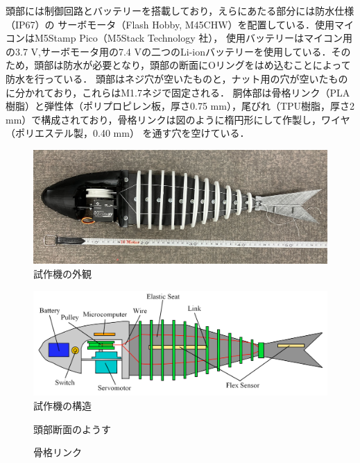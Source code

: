 頭部には制御回路とバッテリーを搭載しており，えらにあたる部分には防水仕様（IP67）の サーボモータ（Flash Hobby, M45CHW）を配置している．使用マイコンはM5Stamp Pico（M5Stack Technology 社），
使用バッテリーはマイコン用の3.7 V,サーボモータ用の7.4 Vの二つのLi-ionバッテリーを使用している．そのため，頭部は防水が必要となり，頭部の断面にOリングをはめ込むことによって防水を行っている．
頭部はネジ穴が空いたものと，ナット用の穴が空いたものに分かれており，これらはM1.7ネジで固定される．
胴体部は骨格リンク（PLA樹脂）と弾性体（ポリプロピレン板，厚さ0.75 mm），尾びれ（TPU樹脂，厚さ2 mm）で構成されており，骨格リンクは図のように楕円形にして作製し，ワイヤ（ポリエステル製，0.40 mm）
を通す穴を空けている．

\begin{figure}[t]
    \centering
    \includegraphics[width=0.80\linewidth]{chapters/picture/sisaku.jpg}
    \caption{試作機の外観}
    \label{fig:sisaku}
\end{figure}
\begin{figure}[t]
    \centering
    \includegraphics[width=0.80\linewidth]{chapters/picture/tentativeschematic.png}
    \caption{試作機の構造}
    \label{fig:kouzou_sisaku}
\end{figure}
\begin{figure}[t]
    \centering
     \begin{minipage}[b]{0.50\linewidth}
        \centering
        \caption{頭部断面のようす}
        \label{fig:danmen}
     \end{minipage}
     \hspace{0.05\linewidth}
     \begin{minipage}[b]{0.25\linewidth}
        \centering
        \caption{骨格リンク}
        \label{fig:link_sen}
     \end{minipage}
\end{figure}

